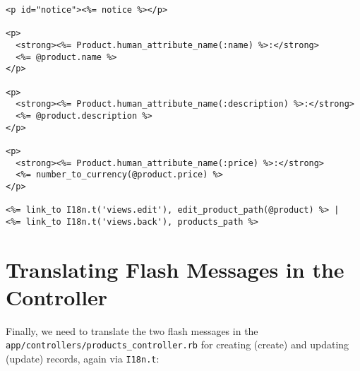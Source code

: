 \documentclass[a4paper]{book}
\begin{document}
\begin{shaded}\begin{verbatim}
<p id="notice"><%= notice %></p>

<p>
  <strong><%= Product.human_attribute_name(:name) %>:</strong>
  <%= @product.name %>
</p>

<p>
  <strong><%= Product.human_attribute_name(:description) %>:</strong>
  <%= @product.description %>
</p>

<p>
  <strong><%= Product.human_attribute_name(:price) %>:</strong>
  <%= number_to_currency(@product.price) %>
</p>

<%= link_to I18n.t('views.edit'), edit_product_path(@product) %> |
<%= link_to I18n.t('views.back'), products_path %>
\end{verbatim}\end{shaded}

\section{Translating Flash Messages in the Controller}\label{translating-flash-messages-in-the-controller}

Finally, we need to translate the two flash messages in the \texttt{app/controllers/products\_controller.rb} for creating (create) and updating (update) records, again via \texttt{I18n.t}:
\end{document}
